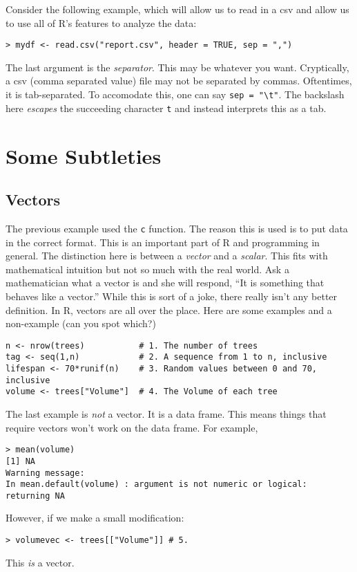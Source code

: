 \documentclass[12pt]{article}
\begin{document}
Consider the following example, which will allow us to read in a csv and allow us to use all of R's features to analyze the data:

\begin{verbatim}
> mydf <- read.csv("report.csv", header = TRUE, sep = ",")
\end{verbatim}

The last argument is the \emph{separator}. This may be whatever you want. Cryptically, a csv (comma separated value) file may not be separated by commas. Oftentimes, it is tab-separated. To accomodate this, one can say \verb|sep = "\t"|. The backslash here \emph{escapes} the succeeding character \verb|t| and instead interprets this as a tab.

\section{Some Subtleties}
\subsection{Vectors}
The previous example used the \verb|c| function. The reason this is used is to put data in the correct format. This is an important part of R and programming in general. The distinction here is between a \emph{vector} and a \emph{scalar}. This fits with mathematical intuition but not so much with the real world. Ask a mathematician what a vector is and she will respond, ``It is something that behaves like a vector.'' While this is sort of a joke, there really isn't any better definition. In R, vectors are all over the place. Here are some examples and a non-example (can you spot which?)
\begin{verbatim}
n <- nrow(trees)           # 1. The number of trees
tag <- seq(1,n)            # 2. A sequence from 1 to n, inclusive
lifespan <- 70*runif(n)    # 3. Random values between 0 and 70, inclusive
volume <- trees["Volume"]  # 4. The Volume of each tree
\end{verbatim}

The last example is \emph{not} a vector. It is a data frame. This means things that require vectors won't work on the data frame. For example,
\begin{verbatim}
> mean(volume)
[1] NA
Warning message:
In mean.default(volume) : argument is not numeric or logical: returning NA
\end{verbatim}
However, if we make a small modification:
\begin{verbatim}
> volumevec <- trees[["Volume"]] # 5.
\end{verbatim}
This \emph{is} a vector.
\end{document}

